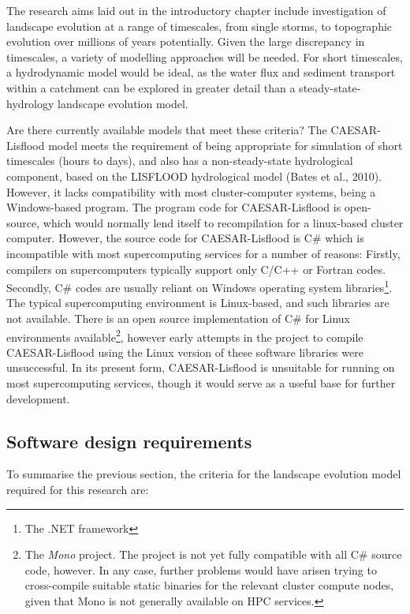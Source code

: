 \documentclass[12pt,oneside,PhD]{muthesis}
\begin{document}
The research aims laid out in the introductory chapter include investigation of landscape evolution at a range of timescales, from single storms, to topographic evolution over millions of years potentially. Given the large discrepancy in timescales, a variety of modelling approaches will be needed. For short timescales, a hydrodynamic model would be ideal, as the water flux and sediment transport within a catchment can be explored in greater detail than a steady-state-hydrology landscape evolution model.

Are there currently available models that meet these criteria? The CAESAR-Lisflood model meets the requirement of being appropriate for  simulation of short timescales (hours to days), and also has a non-steady-state hydrological component, based on the LISFLOOD hydrological model (Bates et al., 2010). However, it lacks compatibility with most cluster-computer systems, being a Windows-based program. The program code for CAESAR-Lisflood is open-source, which would normally lend itself to recompilation for a linux-based cluster computer. However, the source code for CAESAR-Lisflood is C\# which is incompatible with most supercomputing services for a number of reasons: Firstly, compilers on supercomputers typically support only C/C++ or Fortran codes. Secondly, C\# codes are usually reliant on Windows operating system libraries\footnote{The .NET framework}. The typical supercomputing environment is Linux-based, and such libraries are not available. There is an open source implementation of C\# for Linux environments available\footnote{The \textit{Mono} project. The project is not yet fully compatible with all C\# source code, however.  In any case, further problems would have arisen trying to cross-compile suitable static binaries for the relevant cluster compute nodes, given that Mono is not generally available on HPC services.}, however early attempts in the project to compile CAESAR-Lisflood using the Linux version of these software libraries were unsuccessful. In its present form, CAESAR-Lisflood is unsuitable for running on most supercomputing services, though it would serve as a useful base for further development.

\subsection{Software design requirements}
To summarise the previous section, the criteria for the landscape evolution model required for this research are:
\end{document}
